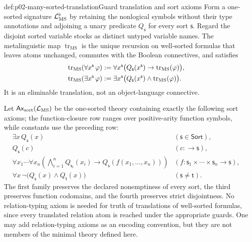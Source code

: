 \begin{hbdefinition}{def:p02-many-sorted-translation}{Guard translation and sort axioms}
Form a one-sorted signature \(\mathcal{L}_{\mathrm{MS}}^{\flat}\) by retaining the
nonlogical symbols without their type annotations and adjoining a unary
predicate \(Q_{\mathsf s}\) for every sort \(\mathsf s\).  Regard the disjoint sorted variable
stocks as distinct untyped variable names.  The metalinguistic map
\(\operatorname{tr}_{\mathrm{MS}}\) is the unique recursion on well-sorted
formulas that leaves atoms unchanged, commutes with the Boolean connectives,
and satisfies
\[
\begin{aligned}
 \operatorname{tr}_{\mathrm{MS}}(\forall x^{\mathsf s}\,\varphi)
   &\mathrel{:=} \forall x^{\mathsf s}\bigl(Q_{\mathsf s}(x^{\mathsf s})\to
        \operatorname{tr}_{\mathrm{MS}}(\varphi)\bigr),\\
 \operatorname{tr}_{\mathrm{MS}}(\exists x^{\mathsf s}\,\varphi)
   &\mathrel{:=} \exists x^{\mathsf s}\bigl(Q_{\mathsf s}(x^{\mathsf s})\land
        \operatorname{tr}_{\mathrm{MS}}(\varphi)\bigr).
\end{aligned}
\]
It is an eliminable translation, not an object-language connective.

Let \(\mathsf{Ax}_{\mathrm{sort}}(\mathcal{L}_{\mathrm{MS}})\) be the one-sorted
theory containing exactly the following sort axioms; the function-closure row
ranges over positive-arity function symbols, while constants use the preceding
row:
\[
\begin{array}{ll}
 \exists x\,Q_{\mathsf s}(x) & (\mathsf s\in\mathsf{Sort}),\\[2pt]
 Q_{\mathsf s}(c) & (c:\longrightarrow\mathsf s),\\[2pt]
 \displaystyle
 \forall x_1\cdots\forall x_n
 \left(\bigwedge_{i=1}^{n}Q_{\mathsf s_i}(x_i)
 \to Q_{\mathsf s}(f(x_1,\ldots,x_n))\right)
 & (f:\mathsf s_1\times\cdots\times\mathsf s_n\longrightarrow\mathsf s),\\[6pt]
 \forall x\,\neg\bigl(Q_{\mathsf s}(x)\land Q_{\mathsf t}(x)\bigr)
 & (\mathsf s\ne\mathsf t).
\end{array}
\]
The first family preserves the declared nonemptiness of every sort, the third
preserves function codomains, and the fourth preserves strict disjointness.
No relation-typing axiom is needed for truth of translations of well-sorted
formulas, since every translated relation atom is reached under the appropriate
guards.  One may add relation-typing axioms as an encoding convention, but
they are not members of the minimal theory defined here.

\end{hbdefinition}

